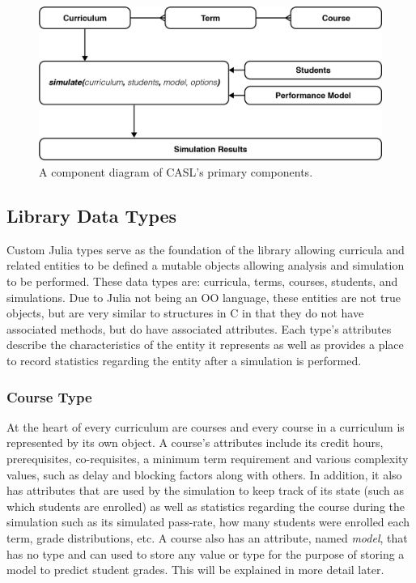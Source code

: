 \documentclass[botnum, fleqn]{unmeethesis}
\begin{document}
    \begin{figure}[h!]
      \centerline{\includegraphics[scale=0.4]{./figures/components.png}}
      \caption{A component diagram of CASL's primary components.} 
      \label{fig:component_diagram}
    \end{figure}

    \subsection{Library Data Types}
      Custom Julia types serve as the foundation of the library allowing curricula and related entities to be defined a mutable objects allowing analysis and simulation to be performed. These data types are: curricula, terms, courses, students, and simulations. Due to Julia not being an OO language, these entities are not true objects, but are very similar to structures in C in that they do not have associated methods, but do have associated attributes. Each type's attributes describe the characteristics of the entity it represents as well as provides a place to record statistics regarding the entity after a simulation is performed.

      \subsubsection{Course Type}
        At the heart of every curriculum are courses and every course in a curriculum is represented by its own object. A course's attributes include its credit hours, prerequisites, co-requisites, a minimum term requirement and various complexity values, such as delay and blocking factors along with others. In addition, it also has attributes that are used by the simulation to keep track of its state (such as which students are enrolled) as well as statistics regarding the course during the simulation such as its simulated pass-rate, how many students were enrolled each term, grade distributions, etc. A course also has an attribute, named \textit{model}, that has no type and can used to store any value or type for the purpose of storing a model to predict student grades. This will be explained in more detail later.
\end{document}
